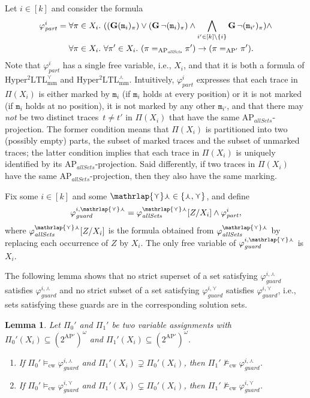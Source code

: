 \documentclass[dvipsnames,10pt,a4paper]{amsart}
\newtheorem{lem}[thm]{Lemma}
\theoremstyle{definition}
\theoremstyle{remark}
\renewcommand{\phi}{\varphi}
\newcommand{\pow}[1]{2^{#1}}
\newcommand{\set}[1]{\{#1\}}
\newcommand{\G}{\mathop{\mathbf{G}\vphantom{a}}\nolimits}
\newcommand{\sohyltlfpmax}{\mathrm{Hyper^2LTL_{\mathrm{mm}}^{\largest}}\xspace}
\newcommand{\sohyltlfpmin}{\mathrm{Hyper^2LTL_{\mathrm{mm}}^{\smallest}}\xspace}
\newcommand{\ap}[0]{\mathrm{AP}}
\newcommand{\smallest}{\curlyvee}
\newcommand{\largest}{\curlywedge}
\newcommand{\smalar}{{\mathrlap{\curlyvee}\curlywedge}}
\newcommand{\allsets}{{\mathit{allSets}}}
\newcommand{\parti}{\mathit{part}}
\newcommand{\cw}{\mathrm{cw}}
\newcommand{\equals}[3]{#1 =_{#3} #2}
\newcommand{\marker}{\texttt{m}}
\newcommand{\guard}{\mathit{guard}}
\begin{document}
Let $i \in [k]$ and consider the formula
\begin{align*}
\phi_\parti^{i} ={}&{} \forall \pi \in X_i.\ ((\G ({\marker_{i}})_\pi) \vee (\G \neg ({\marker_{i}})_\pi) \wedge \bigwedge_{i' \in [k]\setminus\set{i}}\G\neg(\marker_{i'})_\pi ) \wedge \\
{}&{}\forall \pi \in X_i.\ \forall \pi' \in X_i.\ (\equals{\pi}{\pi'}{\ap_\allsets }) \rightarrow (\equals{\pi}{\pi'}{\ap'}).   
\end{align*}
Note that $\phi_\parti^{i}$ has a single free variable, i.e., $X_i$, and that it is both a formula of $\sohyltlfpmin$ and $\sohyltlfpmax$.
Intuitively, $\phi_\parti^{i}$ expresses that each trace in $\Pi(X_i)$ is either marked by $\marker_{i}$ (if ${\marker_{i}}$ holds at every position) or it is not marked (if ${\marker_{i}}$ holds at no position), it is not marked by any other $\marker_{i'}$, and that there may \emph{not} be two distinct traces~$t \neq t'$ in $\Pi(X_i)$ that have the same $\ap_\allsets$-projection.
The former condition means that $\Pi(X_i)$ is partitioned into two (possibly empty) parts, the subset of marked traces and the subset of unmarked traces; the latter condition implies that each trace in $\Pi(X_i)$ is uniquely identified by its $\ap_\allsets$-projection. Said differently, if two traces in $\Pi(X_i)$ have the same $\ap_\allsets$-projection, then they also have the same marking. 

Fix some $i \in [k]$ and some $\smalar \in \set{\largest,\smallest}$, and define 
\[\phi_\guard^{i,\smalar} = \phi_\allsets^{\smalar}[Z/X_i] \wedge \phi_\parti^{i}, \]
where $\phi_\allsets^{\smalar}[Z/X_i]$ is the formula obtained from $\phi_\allsets^{\smalar}$ by replacing each occurrence of $Z$ by $X_i$.
The only free variable of $\phi_\guard^{i,\smalar}$ is $X_i$.

The following lemma shows that no strict superset of a set satisfying $\phi_\guard^{i,\largest}$ satisfies $\phi_\guard^{i,\largest}$ and no strict subset of a set satisfying $\phi_\guard^{i,\smallest}$ satisfies $\phi_\guard^{i,\smallest}$, i.e., sets satisfying these guards are in the corresponding solution sets.

\begin{lem}
\label{lemma_guardcorrectness}
Let $\Pi_0'$ and $\Pi_1'$ be two variable assignments with $\Pi_0'(X_i) \subseteq (\pow{\ap'})^\omega$ and  $\Pi_1'(X_i) \subseteq (\pow{\ap'})^\omega$.
\begin{enumerate}
    
    \item\label{lemma_guardcorrectness_largest}
    If $\Pi_0' \models_\cw \phi_\guard^{i,\largest}$ and $\Pi_1'(X_i) \supsetneq \Pi_0'(X_i)$, then $\Pi_1' \not\models_\cw \phi_\guard^{i,\largest}$.

    \item\label{lemma_guardcorrectness_smallest}
    If $\Pi_0' \models_\cw \phi_\guard^{i,\smallest}$ and $\Pi_1'(X_i) \subsetneq \Pi_0'(X_i)$, then $\Pi_1' \not\models_\cw \phi_\guard^{i,\smallest}$.

\end{enumerate}
\end{lem}
\end{document}
